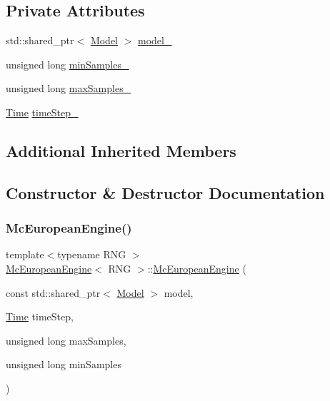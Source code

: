 \subsection*{Private Attributes}
\begin{DoxyCompactItemize}
\item 
std\+::shared\+\_\+ptr$<$ \hyperlink{class_model}{Model} $>$ \hyperlink{class_mc_european_engine_a81d241a7b2c065d2ecb9c8ed367f65b6}{model\+\_\+}
\item 
unsigned long \hyperlink{class_mc_european_engine_a1fc3ac7c29f0ebb565d4f3a6a0baa315}{min\+Samples\+\_\+}
\item 
unsigned long \hyperlink{class_mc_european_engine_a4f951d1b93039bb0cf5e65abb1d61f2e}{max\+Samples\+\_\+}
\item 
\hyperlink{_name_def_8h_ac2d3e0ba793497bcca555c7c2cf64ff3}{Time} \hyperlink{class_mc_european_engine_aa2e85e2348747a35494677719b023991}{time\+Step\+\_\+}
\end{DoxyCompactItemize}
\subsection*{Additional Inherited Members}


\subsection{Constructor \& Destructor Documentation}
\hypertarget{class_mc_european_engine_a22424812ecaf6e04134eeaa45b9d1e1f}{}\label{class_mc_european_engine_a22424812ecaf6e04134eeaa45b9d1e1f} 
\subsubsection{\texorpdfstring{Mc\+European\+Engine()}{McEuropeanEngine()}}
{\footnotesize\ttfamily template$<$typename R\+NG $>$ \\
\hyperlink{class_mc_european_engine}{Mc\+European\+Engine}$<$ R\+NG $>$\+::\hyperlink{class_mc_european_engine}{Mc\+European\+Engine} (\begin{DoxyParamCaption}\item[{const std\+::shared\+\_\+ptr$<$ \hyperlink{class_model}{Model} $>$}]{model,  }\item[{\hyperlink{_name_def_8h_ac2d3e0ba793497bcca555c7c2cf64ff3}{Time}}]{time\+Step,  }\item[{unsigned long}]{max\+Samples,  }\item[{unsigned long}]{min\+Samples }\end{DoxyParamCaption})}



